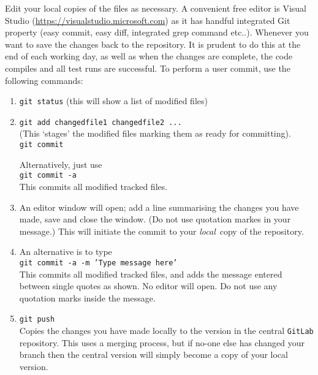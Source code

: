 \documentclass[11pt,a4paper]{report}
\begin{document}
Edit your local copies of the files as necessary. A convenient free editor is Visual Studio (\url{https://visualstudio.microsoft.com}) as it has handful integrated Git property (easy commit, easy diff, integrated grep command etc..). Whenever you want to save the changes 
back to the repository. It is prudent to do this at the end of each working day, as well
as when the changes are complete, the code compiles and all test runs are successful. To
perform a user commit, use the following commands:
\begin{enumerate}

\item \texttt{git status}  (this will show a list of modified files)

\item \texttt{git add changedfile1 changedfile2 ...}  \\
  (This `stages' the modified files marking them as ready for committing).  \\
  \texttt{git commit}

  Alternatively, just use\\
  \texttt{git commit -a} \\
  This commits all modified tracked files.

\item An editor window will open; add a line summarising the changes you have made, save and close the window. (Do not use quotation markes in your message.) This will initiate the commit to your \textit{local}\ copy of the repository.

\item An alternative is to type\\
\texttt{git commit -a -m 'Type message here'} \\
This commits all modified tracked files, and adds the message entered between single quotes as shown.  No editor will open.  Do not use any quotation marks inside the message.

\item \texttt{git push} \\
Copies the changes you have made locally to the version in the central \texttt{GitLab} repository.  This uses a merging process, but if no-one else has changed your branch then the central version will simply become a copy of your local version.
\end{enumerate}
\end{document}
